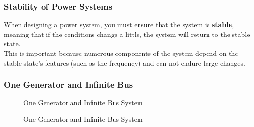 \documentclass[12pt,English]{article}
\begin{document}
\subsubsection{Stability of Power Systems}
When designing a power system, you must ensure that the system is \textbf{stable}, meaning that if the conditions change a little, the system will return to the stable state. \\
This is important because numerous components of the system depend on the stable state's features (such as the frequency) and can not endure large changes.  


\subsubsection{One Generator and Infinite Bus}

\begin{figure}[H]
\begin{center}

\end{center}
\caption{One Generator and Infinite Bus System}
\end{figure}


\begin{figure}[H]
\begin{center}

\end{center}
\caption{One Generator and Infinite Bus System}
\end{figure}

\end{document}
